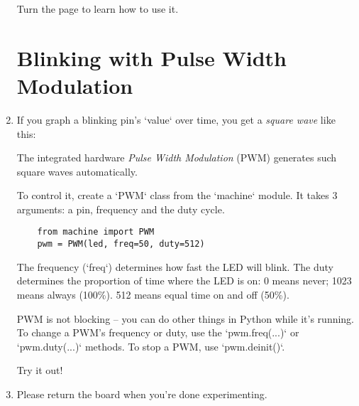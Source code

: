 \documentclass{../tutorial}
\begin{document}
\begin{enumerate}
    Turn the page to learn how to use it.

\clearpage

\section{Blinking with Pulse Width Modulation}

\item
    If you graph a blinking pin's `value` over time, you get a \emph{square wave}
    like this:

    \begin{figure}[h]
        \centering
    \end{figure}

    The integrated hardware \emph{Pulse Width Modulation} (PWM) generates
    such square waves automatically.

    To control it, create a `PWM` class from the `machine` module.
    It takes 3 arguments: a pin, frequency and the duty cycle.

    \begin{lstlisting}
    from machine import PWM
    pwm = PWM(led, freq=50, duty=512)
    \end{lstlisting}

    The frequency (`freq`) determines how fast the LED will blink.
    The duty determines the proportion of time where the LED is on:
    0 means never; 1023 means always (100\%).
    512 means equal time on and off (50\%).

    \begin{comment}
    When experimenting, mind the fact that humans don't perceive light
    intensity linearly.
    A duty cycle of 256 (25\%) is a good “middle” value.
    \end{comment}

    PWM is not blocking -- you can do other things in Python while it's running.
    To change a PWM's frequency or duty, use the `pwm.freq(...)`
    or `pwm.duty(...)` methods.
    To stop a PWM, use `pwm.deinit()`.

    Try it out!

\item
    Please return the board when you're done experimenting.

\end{enumerate}
\end{document}
